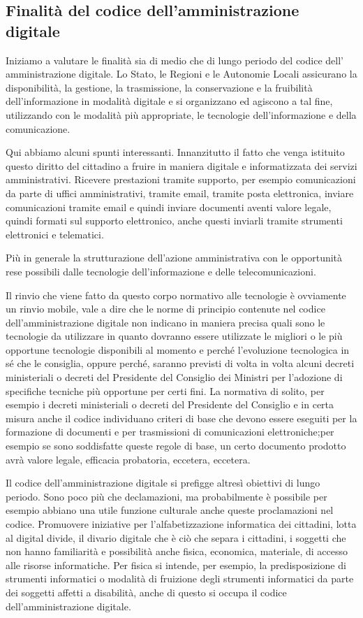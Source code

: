 \subsection{Finalità del codice dell'amministrazione digitale}

Iniziamo a valutare le finalità sia di medio che di lungo periodo del codice dell' amministrazione digitale. Lo Stato, le Regioni e le Autonomie Locali assicurano la disponibilità, la gestione, la trasmissione, la conservazione e la fruibilità dell'informazione in modalità digitale e si organizzano ed agiscono a tal fine, utilizzando con le modalità più appropriate, le tecnologie dell'informazione e della comunicazione.

Qui abbiamo alcuni spunti interessanti. Innanzitutto il fatto che venga istituito questo diritto del cittadino a fruire in maniera digitale e informatizzata dei servizi amministrativi. Ricevere prestazioni tramite supporto, per esempio comunicazioni da parte di uffici amministrativi, tramite email, tramite posta elettronica, inviare comunicazioni tramite email e quindi inviare documenti aventi valore legale, quindi formati sul supporto elettronico, anche questi inviarli tramite strumenti elettronici e telematici.

Più in generale la strutturazione dell'azione amministrativa con le opportunità rese possibili dalle tecnologie dell'informazione e delle telecomunicazioni. 

Il rinvio che viene fatto da questo corpo normativo alle tecnologie è ovviamente un rinvio mobile, vale a dire che le norme di principio contenute nel codice dell'amministrazione digitale non indicano in maniera precisa quali sono le tecnologie da utilizzare in quanto dovranno essere utilizzate le migliori o le più opportune tecnologie disponibili al momento e perché l'evoluzione tecnologica in sé che le consiglia, oppure perché, saranno previsti di volta in volta alcuni decreti ministeriali o decreti del Presidente del Consiglio dei Ministri per l'adozione di specifiche tecniche più opportune per certi fini. 
La normativa di solito, per esempio i decreti ministeriali o decreti del Presidente del Consiglio e in certa misura anche il codice individuano criteri di base che devono essere eseguiti per la formazione di documenti e per trasmissioni di comunicazioni elettroniche;per esempio se sono soddisfatte queste regole di base, un certo documento prodotto avrà valore legale, efficacia probatoria, eccetera, eccetera. 

Il codice dell'amministrazione digitale si prefigge altresì obiettivi di lungo periodo. Sono poco più che declamazioni, ma probabilmente è possibile per esempio abbiano una utile funzione culturale anche queste proclamazioni nel codice. 
Promuovere iniziative per l'alfabetizzazione informatica dei cittadini, lotta al digital divide, il divario digitale che è ciò che separa i cittadini, i soggetti che non hanno familiarità e possibilità anche fisica, economica, materiale, di accesso alle risorse informatiche. 
Per fisica si intende, per esempio, la predisposizione di strumenti informatici o modalità di fruizione degli strumenti informatici da parte dei soggetti affetti a disabilità, anche di questo si occupa il codice dell'amministrazione digitale. 

